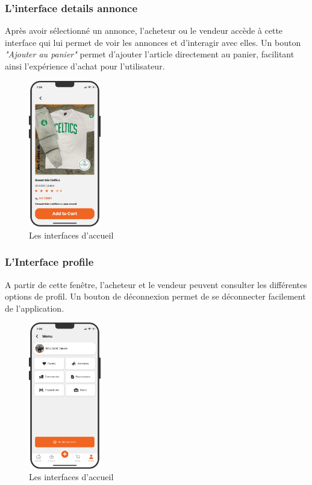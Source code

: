 \documentclass[edit,12pt,a4paper,ChapStyle,oneside,doubleinterligne]{report}
\begin{document}
\subsubsection{L'interface details annonce}
Après avoir sélectionné un annonce, l'acheteur ou le vendeur accède à cette interface qui lui permet de voir les annonces et d'interagir avec elles. Un bouton \textit{"Ajouter au panier"} permet d'ajouter l'article directement au panier, facilitant ainsi l'expérience d'achat pour l'utilisateur.
  \begin{figure} [H]
    \centering
    \includegraphics[width=0.28\textwidth]{images/app annonce.png}
    \caption{Les interfaces d'accueil}
    \label{fig:colors}
\end{figure}

\subsubsection{L'Interface profile}
A partir de cette fenêtre, l'acheteur et le vendeur peuvent consulter les différentes options de profil. Un bouton de déconnexion permet de se déconnecter facilement de l'application.
  \begin{figure} [H]
    \centering
    \includegraphics[width=0.28\textwidth]{images/app profil.png}
    \caption{Les interfaces d'accueil}
    \label{fig:colors}
\end{figure}
\end{document}
